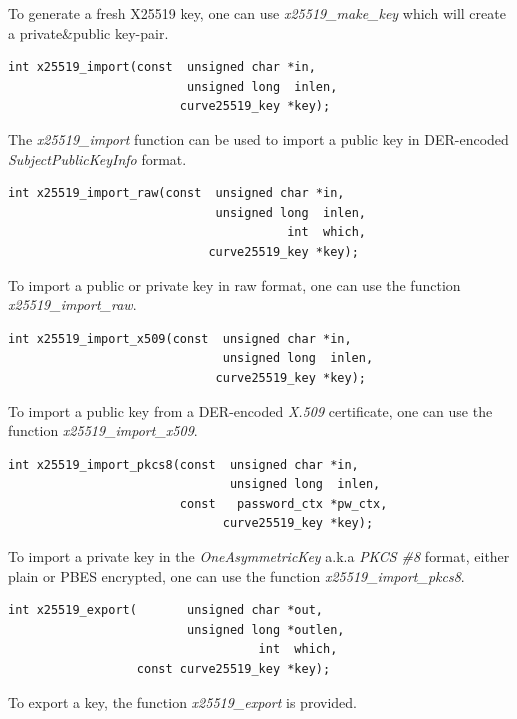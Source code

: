 \documentclass[synpaper]{book}
\begin{document}
To generate a fresh X25519 key, one can use \textit{x25519\_make\_key} which will create a private\&public key-pair.
\begin{verbatim}
int x25519_import(const  unsigned char *in,
                         unsigned long  inlen,
                        curve25519_key *key);
\end{verbatim}

The \textit{x25519\_import} function can be used to import a public key in DER-encoded \textit{SubjectPublicKeyInfo} format.

\begin{verbatim}
int x25519_import_raw(const  unsigned char *in,
                             unsigned long  inlen,
                                       int  which,
                            curve25519_key *key);
\end{verbatim}

To import a public or private key in raw format, one can use the function \textit{x25519\_import\_raw}.

\begin{verbatim}
int x25519_import_x509(const  unsigned char *in,
                              unsigned long  inlen,
                             curve25519_key *key);
\end{verbatim}

To import a public key from a DER-encoded \textit{X.509} certificate, one can use the function \textit{x25519\_import\_x509}.

\begin{verbatim}
int x25519_import_pkcs8(const  unsigned char *in,
                               unsigned long  inlen,
                        const   password_ctx *pw_ctx,
                              curve25519_key *key);
\end{verbatim}

To import a private key in the \textit{OneAsymmetricKey} a.k.a \textit{PKCS \#8} format, either plain or PBES encrypted,
one can use the function \textit{x25519\_import\_pkcs8}.

\begin{verbatim}
int x25519_export(       unsigned char *out,
                         unsigned long *outlen,
                                   int  which,
                  const curve25519_key *key);
\end{verbatim}

To export a key, the function \textit{x25519\_export} is provided.
\end{document}
